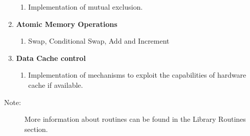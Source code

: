 \begin{enumerate}
\begin{enumerate}
\item Implementation of mutual exclusion.
\end{enumerate}
\item \textbf{Atomic Memory Operations}

\begin{enumerate}
\item Swap, Conditional Swap, Add and Increment 
\end{enumerate}
\item \textbf{Data Cache control}

\begin{enumerate}
\item Implementation of mechanisms to exploit the capabilities of hardware
cache if available.
\end{enumerate}
\end{enumerate}
\begin{description}
\item [{{Note:}}] More information about \openshmem routines can be found
in the Library Routines section.
\end{description}

